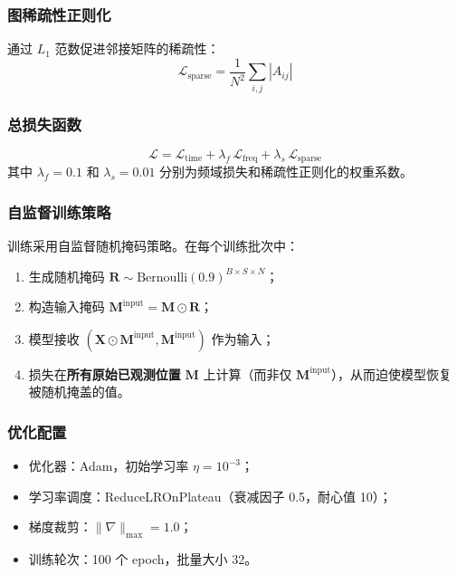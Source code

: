 \documentclass[UTF8]{ctexart}
\begin{document}
\subsubsection{图稀疏性正则化}

通过 $L_1$ 范数促进邻接矩阵的稀疏性：
\begin{equation}
    \mathcal{L}_{\text{sparse}} = \frac{1}{N^2} \sum_{i,j} |A_{ij}|
\end{equation}

\subsubsection{总损失函数}

\begin{equation}
    \mathcal{L} = \mathcal{L}_{\text{time}} + \lambda_f \, \mathcal{L}_{\text{freq}} + \lambda_s \, \mathcal{L}_{\text{sparse}}
\end{equation}
其中 $\lambda_f = 0.1$ 和 $\lambda_s = 0.01$ 分别为频域损失和稀疏性正则化的权重系数。

\subsubsection{自监督训练策略}

训练采用自监督随机掩码策略。在每个训练批次中：
\begin{enumerate}
    \item 生成随机掩码 $\mathbf{R} \sim \mathrm{Bernoulli}(0.9)^{B \times S \times N}$；
    \item 构造输入掩码 $\mathbf{M}^{\text{input}} = \mathbf{M} \odot \mathbf{R}$；
    \item 模型接收 $(\mathbf{X} \odot \mathbf{M}^{\text{input}}, \mathbf{M}^{\text{input}})$ 作为输入；
    \item 损失在\textbf{所有原始已观测位置} $\mathbf{M}$ 上计算（而非仅 $\mathbf{M}^{\text{input}}$），从而迫使模型恢复被随机掩盖的值。
\end{enumerate}

\subsubsection{优化配置}

\begin{itemize}
    \item 优化器：Adam，初始学习率 $\eta = 10^{-3}$；
    \item 学习率调度：ReduceLROnPlateau（衰减因子 0.5，耐心值 10）；
    \item 梯度裁剪：$\|\nabla\|_{\max} = 1.0$；
    \item 训练轮次：100 个 epoch，批量大小 32。
\end{itemize}
\end{document}
